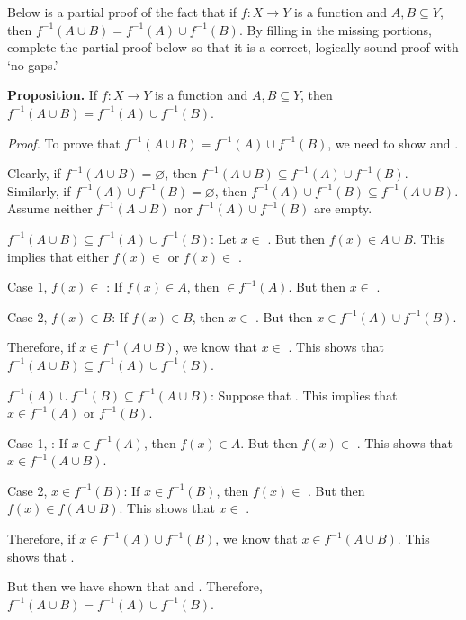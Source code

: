 \documentclass[11pt,letterpaper]{article}
\newcommand{\blank}[1]{\underline{\hspace{#1}}} %
\begin{document}
\newpage



 Below is a partial proof of the fact that if $f: X \to Y$ is a function and $A, B \subseteq Y$, then $f^{-1}(A \cup B)= f^{-1}(A) \cup f^{-1}(B)$. By filling in the missing portions, complete the partial proof below so that it is a correct, logically sound proof with `no gaps.' \pspace

\noindent \textbf{Proposition.} If $f: X \to Y$ is a function and $A, B \subseteq Y$, then $f^{-1}(A \cup B)= f^{-1}(A) \cup f^{-1}(B)$. \pspace

\textit{Proof.} To prove that $f^{-1}(A \cup B)= f^{-1}(A) \cup f^{-1}(B)$, we need to show \blank{5cm} \pspace and \blank{5cm}. 


Clearly, if $f^{-1}(A \cup B)= \varnothing$, then $f^{-1}(A \cup B) \subseteq f^{-1}(A) \cup f^{-1}(B)$. Similarly, if $f^{-1}(A) \cup f^{-1}(B)= \varnothing$, then $f^{-1}(A) \cup f^{-1}(B) \subseteq f^{-1}(A \cup B)$. Assume neither $f^{-1}(A \cup B)$ nor $f^{-1}(A) \cup f^{-1}(B)$ are empty. 


$f^{-1}(A \cup B) \subseteq f^{-1}(A) \cup f^{-1}(B)$: Let $x \in$ \blank{3cm}. But then $f(x) \in A \cup B$. This implies \pspace that either $f(x) \in$ \blank{3cm} or $f(x) \in$ \blank{3cm}. \pspace

	\hspace{1cm} Case 1, $f(x) \in$ \blank{3cm}: If $f(x) \in A$, then \blank{3cm} $\in f^{-1}(A)$. But then \pspace \hspace{1cm} $x \in$ \blank{4cm}. \pvspace{1cm}

	\hspace{1cm} Case 2, $f(x) \in B$: If $f(x) \in B$, then $x \in$ \blank{3cm}. But then $x \in f^{-1}(A) \cup f^{-1}(B)$. \pvspace{1cm}

Therefore, if $x \in f^{-1}(A \cup B)$, we know that $x \in$ \blank{5cm}. This shows \pspace that $f^{-1}(A \cup B) \subseteq f^{-1}(A) \cup f^{-1}(B)$. 


$f^{-1}(A) \cup f^{-1}(B) \subseteq f^{-1}(A \cup B)$: Suppose that \blank{5cm}. This implies \pspace that $x \in f^{-1}(A)$ or $f^{-1}(B)$. \pspace

	\hspace{1cm} Case 1, \blank{3cm}: If $x \in f^{-1}(A)$, then $f(x) \in A$. But then $f(x) \in$ \blank{3cm}. \pspace \hspace{1cm} This shows that $x \in f^{-1}(A \cup B)$. \pvspace{1cm}

	\hspace{1cm} Case 2, $x \in f^{-1}(B)$: If $x \in f^{-1}(B)$, then $f(x) \in$ \blank{3cm}. But then $f(x) \in f(A \cup B)$. \pspace \hspace{1cm} This shows that $x \in$ \blank{3cm}. 

Therefore, if $x \in f^{-1}(A) \cup f^{-1}(B)$, we know that $x \in f^{-1}(A \cup B)$. This shows that \blank{4cm}. 


But then we have shown that \blank{4cm} and \blank{4cm}. Therefore, \pspace $f^{-1}(A \cup B)= f^{-1}(A) \cup f^{-1}(B)$. 
\end{document}
